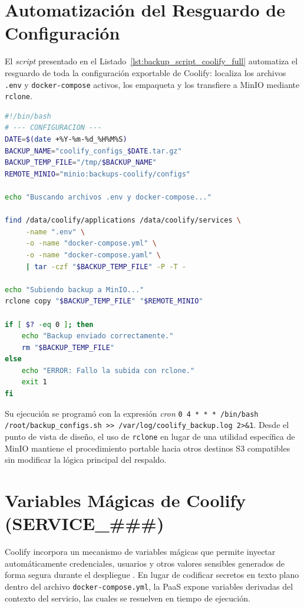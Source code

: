 \section{Automatización del Resguardo de Configuración}
\label{AppendixB:ConfigBackup}

El \textit{script} presentado en el Listado~\ref{lst:backup_script_coolify_full} automatiza el resguardo de toda la configuración exportable de Coolify: localiza los archivos \texttt{.env} y \texttt{docker-compose} activos, los empaqueta y los transfiere a MinIO mediante \texttt{rclone}.

\begin{lstlisting}[language=bash, caption={Script de respaldo selectivo de configuraciones exportables hacia MinIO}, label={lst:backup_script_coolify_full}]
#!/bin/bash
# --- CONFIGURACION ---
DATE=$(date +%Y-%m-%d_%H%M%S)
BACKUP_NAME="coolify_configs_$DATE.tar.gz"
BACKUP_TEMP_FILE="/tmp/$BACKUP_NAME"
REMOTE_MINIO="minio:backups-coolify/configs"

echo "Buscando archivos .env y docker-compose..."

find /data/coolify/applications /data/coolify/services \
     -name ".env" \
     -o -name "docker-compose.yml" \
     -o -name "docker-compose.yaml" \
     | tar -czf "$BACKUP_TEMP_FILE" -P -T -

echo "Subiendo backup a MinIO..."
rclone copy "$BACKUP_TEMP_FILE" "$REMOTE_MINIO"

if [ $? -eq 0 ]; then
    echo "Backup enviado correctamente."
    rm "$BACKUP_TEMP_FILE"
else
    echo "ERROR: Fallo la subida con rclone."
    exit 1
fi
\end{lstlisting}

Su ejecución se programó con la expresión \textit{cron} \nolinkurl{0 4 * * * /bin/bash /root/backup_configs.sh >> /var/log/coolify_backup.log 2>&1}. Desde el punto de vista de diseño, el uso de \texttt{rclone} en lugar de una utilidad específica de MinIO mantiene el procedimiento portable hacia otros destinos S3 compatibles sin modificar la lógica principal del respaldo.

\section{Variables Mágicas de Coolify (SERVICE\_\#\#\#)}
\label{AppendixB:CoolifyMagic}

Coolify incorpora un mecanismo de variables mágicas que permite inyectar automáticamente credenciales, usuarios y otros valores sensibles generados de forma segura durante el despliegue \cite{coolify_magic_env_vars}. En lugar de codificar secretos en texto plano dentro del archivo \texttt{docker-compose.yml}, la PaaS expone variables derivadas del contexto del servicio, las cuales se resuelven en tiempo de ejecución.


